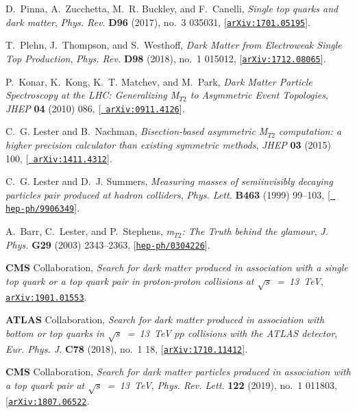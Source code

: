 \documentclass[review]{elsarticle}
\begin{document}
\begin{thebibliography}{100}
D.~Pinna, A.~Zucchetta, M.~R. Buckley, and F.~Canelli, {\it {Single top quarks
  and dark matter}},  {\em Phys. Rev.} {\bf D96} (2017), no.~3 035031,
  [\href{http://arxiv.org/abs/1701.05195}{{\tt arXiv:1701.05195}}].

T.~Plehn, J.~Thompson, and S.~Westhoff, {\it {Dark Matter from Electroweak
  Single Top Production}},  {\em Phys. Rev.} {\bf D98} (2018), no.~1 015012,
  [\href{http://arxiv.org/abs/1712.08065}{{\tt arXiv:1712.08065}}].

P.~Konar, K.~Kong, K.~T. Matchev, and M.~Park, {\it {Dark Matter Particle
  Spectroscopy at the LHC: Generalizing M$_{T2}$ to Asymmetric Event Topologies}},
   {\em JHEP} {\bf 04} (2010) 086, [\href{http://arxiv.org/abs/0911.4126}{{\tt
  arXiv:0911.4126}}].

C.~G. Lester and B.~Nachman, {\it {Bisection-based asymmetric M$_{T2}$
  computation: a higher precision calculator than existing symmetric methods}},
   {\em JHEP} {\bf 03} (2015) 100, [\href{http://arxiv.org/abs/1411.4312}{{\tt
  arXiv:1411.4312}}].

C.~G. Lester and D.~J. Summers, {\it {Measuring masses of semiinvisibly
  decaying particles pair produced at hadron colliders}},  {\em Phys. Lett.}
  {\bf B463} (1999) 99--103, [\href{http://arxiv.org/abs/hep-ph/9906349}{{\tt
  hep-ph/9906349}}].

A.~Barr, C.~Lester, and P.~Stephens, {\it {m$_{T2}$: The Truth behind the
  glamour}},  {\em J. Phys.} {\bf G29} (2003) 2343--2363,
  [\href{http://arxiv.org/abs/hep-ph/0304226}{{\tt hep-ph/0304226}}].
  
{\bf CMS} Collaboration, {\it {Search for dark matter
  produced in association with a single top quark or a top quark pair in
  proton-proton collisions at $\sqrt{s}$~=~13~TeV}},
  \href{http://arxiv.org/abs/1901.01553}{{\tt arXiv:1901.01553}}.  

{\bf ATLAS} Collaboration, {\it {Search for dark matter
  produced in association with bottom or top quarks in $\sqrt{s}$~=~13~TeV $pp$
  collisions with the ATLAS detector}},  {\em Eur. Phys. J.} {\bf C78} (2018),
  no.~1 18, [\href{http://arxiv.org/abs/1710.11412}{{\tt arXiv:1710.11412}}].

{\bf CMS} Collaboration, {\it {Search for dark matter
  particles produced in association with a top quark pair at $\sqrt{s}$~=~13~TeV}},  
  {\em Phys. Rev. Lett.} {\bf 122} (2019), no.~1 011803,
  [\href{http://arxiv.org/abs/1807.06522}{{\tt arXiv:1807.06522}}.


\end{thebibliography}
\end{document}
